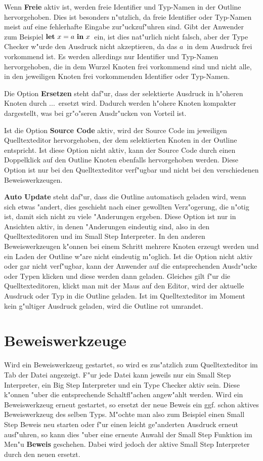 Wenn {\bf Freie} aktiv ist, werden freie Identifier und Typ-Namen in der
Outline hervorgehoben. Dies ist besonders n"utzlich, da freie Identifier
oder Typ-Namen meist auf eine fehlerhafte Eingabe zur"uckzuf"uhren sind.
Gibt der Anwender zum Beispiel \glqq$\textbf{let}\ x = a\ \textbf{in}\ x$\grqq\ ein, ist 
dies nat"urlich nicht falsch, aber der Type Checker w"urde den Ausdruck
nicht akzeptieren, da das \glqq$a$\grqq\ in dem Ausdruck frei 
vorkommend ist. Es werden allerdings nur Identifier und Typ-Namen
hervorgehoben, die in dem Wurzel Knoten frei vorkommend sind und nicht
alle, in den jeweiligen Knoten frei vorkommenden Identifier oder Typ-Namen.

Die Option {\bf Ersetzen} steht daf"ur, dass der selektierte Ausdruck
in h"oheren Knoten durch \glqq...\grqq\ ersetzt wird. Dadurch
werden h"ohere Knoten kompakter dargestellt, was bei gr"o"seren Ausdr"ucken
von Vorteil ist.

Ist die Option {\bf Source Code} aktiv, wird der Source Code im jeweiligen
Quelltexteditor hervorgehoben, der dem selektierten Knoten in der Outline
entspricht. Ist diese Option nicht aktiv, kann der Source Code durch einen
Doppelklick auf den Outline Knoten ebenfalls hervorgehoben werden. Diese
Option ist nur bei den Quelltexteditor verf"ugbar und nicht bei den
verschiedenen Beweiswerkzeugen.

{\bf Auto Update} steht daf"ur, dass die Outline automatisch geladen wird,
wenn sich etwas "andert, dies geschieht nach einer gewollten Verz"ogerung,
die n"otig ist, damit sich nicht zu viele "Anderungen ergeben. Diese Option
ist nur in Ansichten aktiv, in denen "Anderungen eindeutig sind, also in den
Quelltexteditoren und im Small Step Interpreter. In den anderen
Beweiswerkzeugen k"onnen bei einem Schritt mehrere Knoten erzeugt werden
und ein Laden der Outline w"are nicht eindeutig m"oglich.
Ist die Option nicht aktiv oder gar nicht verf"ugbar, kann der Anwender auf 
die entsprechenden Ausdr"ucke oder Typen klicken und diese werden dann geladen.
Gleiches gilt f"ur die Quelltexteditoren, klickt man mit der Maus auf den
Editor, wird der aktuelle Ausdruck oder Typ in die Outline geladen. Ist im
Quelltexteditor im Moment kein g"ultiger Ausdruck geladen, wird die Outline
rot umrandet.


\section {Beweiswerkzeuge}
\label{Beweiswerkzeuge} Wird ein Beweiswerkzeug gestartet, so wird
es zus"atzlich zum Quelltexteditor im Tab der Datei angezeigt. F"ur
jede Datei kann jeweils nur ein Small Step Interpreter, ein Big Step
Interpreter und ein Type Checker aktiv sein. Diese k"onnen "uber die
entsprechende Schaltfl"achen angew"ahlt werden. Wird ein
Beweiswerkzeug erneut gestartet, so ersetzt der neue Beweis ein ggf.
schon aktives Beweiswerkzeug des selben Typs. M"ochte man also zum
Beispiel einen Small Step Beweis neu starten oder f"ur einen leicht
ge"anderten Ausdruck erneut ausf"uhren, so kann dies "uber eine
erneute Anwahl der Small Step Funktion im Men"u {\bf Beweis}
geschehen. Dabei wird jedoch der aktive Small Step Interpreter durch
den neuen ersetzt.

